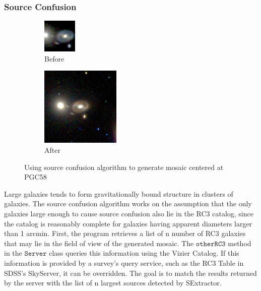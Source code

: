 \documentclass[5p]{elsarticle}
\begin{document}
	\subsubsection{Source Confusion}
\begin{figure}
\centering
\begin{subfigure}{.4\textwidth}
\centering
  \includegraphics[width=.4\linewidth]{figures/PGC58b4SC}
  \caption{Before}
\end{subfigure}%
\hspace{-10pt}
\begin{subfigure}{.4\textwidth}
\centering
  \includegraphics[width=.4\linewidth]{figures/PGC58afterSC}
  \caption{After} 
\end{subfigure}
\caption{Using source confusion algorithm to generate mosaic centered at PGC58}
\label{fig:SCdemo}
\end{figure}
\indent Large galaxies tends to form gravitationally bound structure in clusters of galaxies. The source confusion algorithm works on the assumption that the only galaxies large enough to cause source confusion also lie in the RC3 catalog, since the catalog is reasonably complete for galaxies having apparent diameters larger than 1 arcmin. First, the program retrieves a list of n number of RC3 galaxies that may lie in the field of view of the generated mosaic. The $\texttt{otherRC3}$ method in the $\texttt{Server}$ class queries this information using the Vizier Catalog. If this information is provided by a survey's query service, such as the RC3 Table in SDSS's SkyServer, it can be overridden. The goal is to match the results returned by the server with the list of n largest sources detected by SExtractor. 
\end{document}
